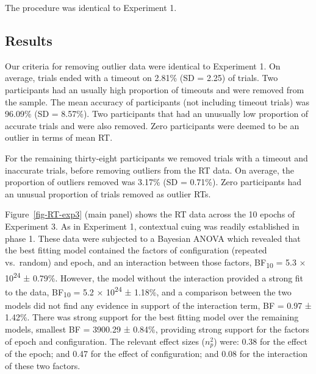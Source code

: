 \documentclass[
  man,
  floatsintext,
  longtable,
  nolmodern,
  notxfonts,
  notimes,
  colorlinks=true,linkcolor=blue,citecolor=blue,urlcolor=blue]{apa7}
\begin{document}
The procedure was identical to Experiment 1.

\subsection{Results}\label{results-2}

Our criteria for removing outlier data were identical to Experiment 1.
On average, trials ended with a timeout on 2.81\% (SD = 2.25) of trials.
Two participants had an usually high proportion of timeouts and were
removed from the sample. The mean accuracy of participants (not
including timeout trials) was 96.09\% (SD = 8.57\%). Two participants
that had an unusually low proportion of accurate trials and were also
removed. Zero participants were deemed to be an outlier in terms of mean
RT.

For the remaining thirty-eight participants we removed trials with a
timeout and inaccurate trials, before removing outliers from the RT
data. On average, the proportion of outliers removed was 3.17\% (SD =
0.71\%). Zero participants had an unusual proportion of trials removed
as outlier RTs.

Figure~\ref{fig-RT-exp3} (main panel) shows the RT data across the 10
epochs of Experiment 3. As in Experiment 1, contextual cuing was readily
established in phase 1. These data were subjected to a Bayesian ANOVA
which revealed that the best fitting model contained the factors of
configuration (repeated vs.~random) and epoch, and an interaction
between those factors, BF\textsubscript{10} = 5.3 ×
10\textsuperscript{24} ± 0.79\%. However, the model without the
interaction provided a strong fit to the data, BF\textsubscript{10} =
5.2 × 10\textsuperscript{24} ± 1.18\%, and a comparison between the two
models did not find any evidence in support of the interaction term, BF
= 0.97 ± 1.42\%. There was strong support for the best fitting model
over the remaining models, smallest BF = 3900.29 ± 0.84\%, providing
strong support for the factors of epoch and configuration. The relevant
effect sizes (\(n^2_p\)) were: 0.38 for the effect of the epoch; and
0.47 for the effect of configuration; and 0.08 for the interaction of
these two factors.
\end{document}
